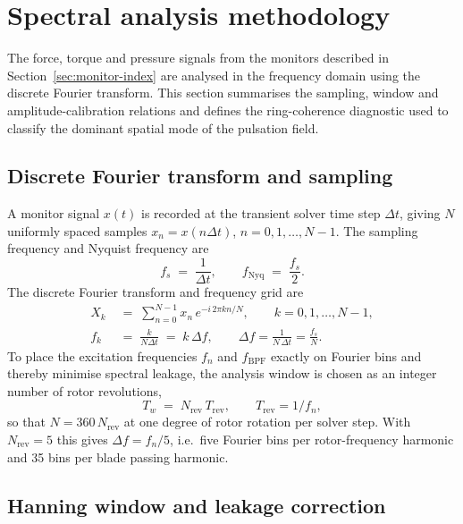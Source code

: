 \section{Spectral analysis methodology}
\label{sec:spec}
 
The force, torque and pressure signals from the monitors described
in Section~\ref{sec:monitor-index} are analysed in the frequency
domain using the discrete Fourier transform. This section summarises
the sampling, window and amplitude-calibration relations and defines
the ring-coherence diagnostic used to classify the dominant spatial
mode of the pulsation field.
 
\subsection{Discrete Fourier transform and sampling}
\label{sec:spec-dft}
 
A monitor signal $x(t)$ is recorded at the transient solver time
step $\Delta t$, giving $N$ uniformly spaced samples
$x_n = x(n\Delta t)$, $n = 0,1,\dots,N-1$. The sampling frequency
and Nyquist frequency are
\begin{equation}
    f_s \;=\; \frac{1}{\Delta t},\qquad
    f_{\mathrm{Nyq}} \;=\; \frac{f_s}{2}. \label{eq:fs_fnyq}
\end{equation}
The discrete Fourier transform and frequency grid are
\begin{align}
    X_k &\;=\; \sum_{n=0}^{N-1} x_n\, e^{-i\,2\pi k n / N},
    \qquad k = 0,1,\dots,N-1, \label{eq:dft}\\
    f_k &\;=\; \frac{k}{N\Delta t} \;=\; k\,\Delta f,
    \qquad \Delta f = \frac{1}{N\,\Delta t} = \frac{f_s}{N}.
    \label{eq:dft_f}
\end{align}
To place the excitation frequencies $f_n$ and $f_{\mathrm{BPF}}$
exactly on Fourier bins and thereby minimise spectral leakage, the
analysis window is chosen as an integer number of rotor revolutions,
\begin{equation}
    T_w \;=\; N_{\mathrm{rev}}\,T_{\mathrm{rev}},
    \qquad T_{\mathrm{rev}} = 1/f_n, \label{eq:Tw}
\end{equation}
so that $N = 360\,N_{\mathrm{rev}}$ at one degree of rotor rotation
per solver step. With $N_{\mathrm{rev}}=5$ this gives
$\Delta f = f_n/5$, i.e.\ five Fourier bins per rotor-frequency harmonic and
35 bins per blade passing harmonic.
 
\subsection{Hanning window and leakage correction}
\label{sec:spec-window}
 
